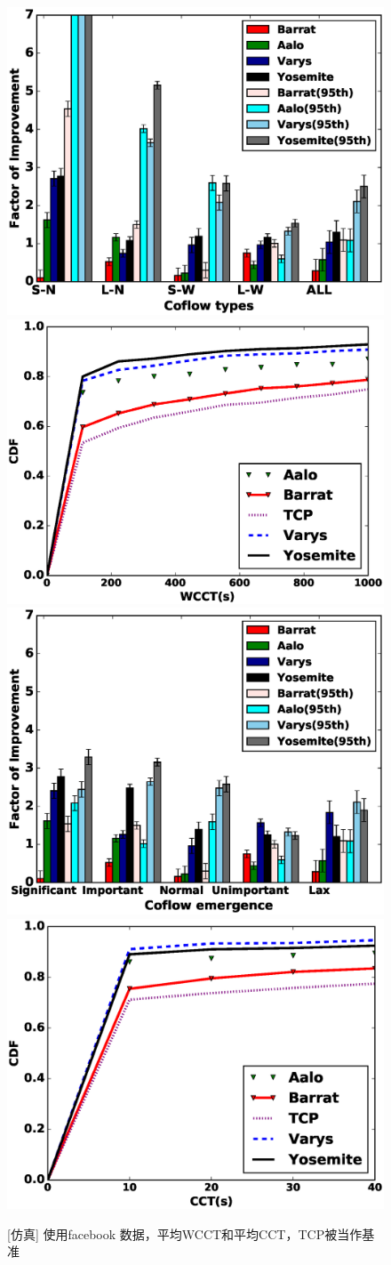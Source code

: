 \begin{figure}[h]
\setlength{\abovecaptionskip}{0pt} 
\setlength{\belowcaptionskip}{1pt} 
  \centering%
    {\includegraphics[width=0.5\columnwidth]{figures/Yosemite/figs/evaluation/ex2/weight_real_type.eps}}%
      {\includegraphics[width=0.5\columnwidth]{figures/Yosemite/figs/evaluation/ex2/weight_CDF_compare.eps}}
    {\includegraphics[width=0.5\columnwidth]{figures/Yosemite/figs/evaluation/ex2/nfake1.eps}}%
      {\includegraphics[width=0.5\columnwidth]{figures/Yosemite/figs/evaluation/ex2/CDF_compare.eps}}
  \caption{[仿真] 使用facebook 数据，平均WCCT和平均CCT，TCP被当作基准}
  \label{Yosemite-evaluation_facebook_fig}
\end{figure}

